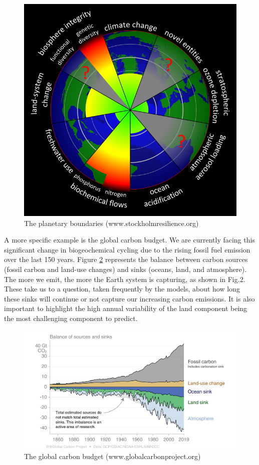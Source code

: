 \documentclass[12pt,oneside]{book}
\begin{document}
\begin{figure}

{\centering \includegraphics[width=0.6\linewidth]{figures/chap1/planetary_boundaries} 

}

\caption{The planetary boundaries (www.stockholmresilience.org)}\label{fig:f1}
\end{figure}

A more specific example is the global carbon budget. We are currently
facing this significant change in biogeochemical cycling due to the
rising fossil fuel emission over the last 150 years. Figure \ref{fig:f2}
represents the balance between carbon sources (fossil carbon and
land-use changes) and sinks (oceans, land, and atmosphere). The more we
emit, the more the Earth system is capturing, as shown in Fig.2. These
take us to a question, taken frequently by the models, about how long
these sinks will continue or not capture our increasing carbon
emissions. It is also important to highlight the high annual variability
of the land component being the most challenging component to predict.

\begin{figure}

{\centering \includegraphics[width=0.8\linewidth]{figures/chap1/carbon_budget} 

}

\caption{The global carbon budget (www.globalcarbonproject.org)}\label{fig:f2}
\end{figure}
\end{document}

